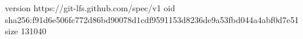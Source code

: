 version https://git-lfs.github.com/spec/v1
oid sha256:f91d6e506fc772d86bd90078d1cdf9591153d8236de9a53fbd044a4abf0d7e51
size 131040
